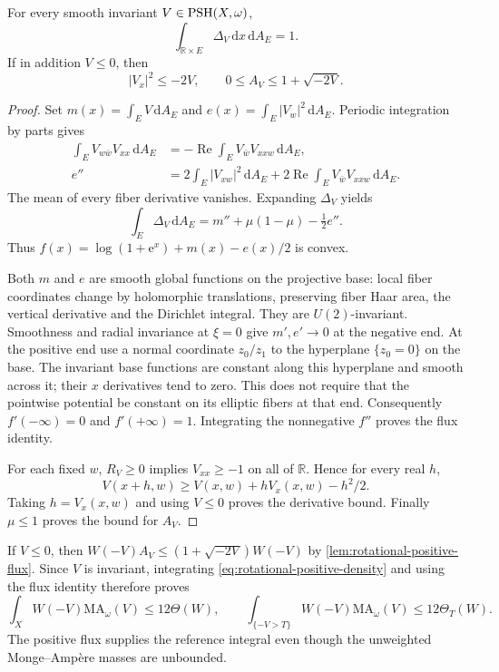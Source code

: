 \begin{lemma}\label{lem:rotational-positive-flux}
For every smooth invariant $V\in\mathrm{PSH}(X,\omega)$,
\[
 \int_{\mathbb R\times E}\Delta_V\,\mathrm dx\,\mathrm dA_E=1.
\]
If in addition $V\leq0$, then
\[
 |V_x|^2\leq-2V,\qquad 0\leq A_V\leq1+\sqrt{-2V}.
\]
\end{lemma}
\begin{proof}
Set $m(x)=\int_EV\,\mathrm dA_E$ and
$e(x)=\int_E|V_w|^2\,\mathrm dA_E$.
Periodic integration by parts gives
\[
 \begin{split}
 \int_E V_{w\bar w}V_{xx}\,\mathrm dA_E
    &=-\operatorname{Re}\int_EV_{\bar w}V_{xxw}\,\mathrm dA_E,\\
 e''&=2\int_E|V_{xw}|^2\,\mathrm dA_E
       +2\operatorname{Re}\int_EV_{\bar w}V_{xxw}\,\mathrm dA_E.
 \end{split}
\]
The mean of every fiber derivative vanishes. Expanding $\Delta_V$ yields
\[
 \int_E\Delta_V\,\mathrm dA_E
   =m''+\mu(1-\mu)-\tfrac12e''.
\]
Thus $f(x)=\log(1+\mathrm e^x)+m(x)-e(x)/2$ is convex.

Both $m$ and $e$ are smooth global functions on the projective base:
local fiber coordinates change by holomorphic translations, preserving
fiber Haar area, the vertical derivative and the Dirichlet integral.
They are $U(2)$-invariant. Smoothness and radial invariance at $\xi=0$
give $m',e'\to0$ at the negative end. At the positive end use a normal
coordinate $z_0/z_1$ to the hyperplane $\{z_0=0\}$ on the base.
The invariant base functions are constant along this hyperplane and
smooth across it; their $x$ derivatives tend to zero. This does not
require that the pointwise potential be constant on its elliptic fibers
at that end. Consequently $f'(-\infty)=0$ and $f'(+\infty)=1$.
Integrating the nonnegative $f''$ proves the flux identity.

For each fixed $w$, $R_V\geq0$ implies $V_{xx}\geq-1$ on all of $\mathbb R$.
Hence for every real $h$,
\[
 V(x+h,w)\geq V(x,w)+hV_x(x,w)-h^2/2.
\]
Taking $h=V_x(x,w)$ and using $V\leq0$ proves the derivative bound.
Finally $\mu\leq1$ proves the bound for $A_V$.
\end{proof}

If $V\leq0$, then $W(-V)A_V\leq(1+\sqrt{-2V})W(-V)$ by \cref{lem:rotational-positive-flux}. Since $V$ is invariant, integrating \eqref{eq:rotational-positive-density} and using the flux identity therefore proves
\begin{equation}\label{eq:rotational-smooth-upper}
 \int_XW(-V)\mathrm{MA}_\omega(V)\leq12\Theta(W),\qquad
 \int_{\{-V>T\}}W(-V)\mathrm{MA}_\omega(V)\leq12\Theta_T(W).
\end{equation}
The positive flux supplies the reference integral even though the unweighted Monge--Amp\`ere masses are unbounded.

